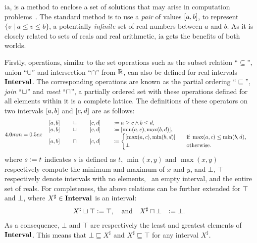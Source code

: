 \Gls{ia}, is a method to enclose a set of solutions that may arise in
computation problems~\cite{moore}.  The standard method is to use a \emph{pair}
of values $\left[{a}, {b}\right]$, to represent $\{ v \mid a \leq v \leq b \}$, a
potentially \emph{infinite} set of real numbers between $a$ and $b$.  As it
is closely related to sets of reals and real arithmetic, \gls{ia} gets the
benefits of both worlds.

Firstly, operations, similar to the set operations such as the subset relation
``$\subseteq$'', union ``$\cup$'' and intersection ``$\cap$'' from $\mathbb{R}$,
can also be defined for real intervals $\mathbf{Interval}$.  The corresponding
operations are known as the partial ordering ``$\sqsubseteq$'', \emph{join}
``$\sqcup$'' and \emph{meet} ``$\sqcap$'', a partially ordered set with these
operations defined for all elements within it is a complete lattice.  The
definitions of these operators on two intervals $\left[{a}, {b}\right]$ and
$\left[{c}, {d}\right]$ are as follows:
\begin{equation}
    \arraycolsep=0.5ex
    \begin{array}{lcll}
        \interval{a}{b} & \sqsubseteq & \interval{c}{d}
            &\defeq a \geq c \wedge b \leq d, \\
        \interval{a}{b} & \join & \interval{c}{d}
            &\defeq [\min(a, c), \max(b, d)], \\
        \interval{a}{b} & \meet & \interval{c}{d}
            &\defeq \left\{
                \begin{aligned}
                    & [\max(a, c), \min(b, d)] \quad &&
                        \text{if~} \max(a, c) \leq \min(b, d), \\
                    & \bot && \text{otherwise}.
                \end{aligned}
            \right.
    \end{array}\label{bg:eq:interval_relations}
\end{equation}
where $s \vcentcolon= t$ indicates $s$ is defined as $t$, $\min(x, y)$ and $\max(x,
y)$ respectively compute the minimum and maximum of $x$ and $y$, and $\bot$,
$\top$ respectively denote intervals with no elements, \ie~an empty interval,
and the entire set of reals.  For completeness, the above relations can be
further extended for $\top$ and $\bot$, where $X^\sharp \in \mathbf{Interval}$ is an
interval:
\begin{equation}
    \begin{aligned}
        X^\sharp \sqcup \top &\vcentcolon= \top, \quad \text{and} \quad
        X^\sharp \sqcap \bot &\vcentcolon= \bot.
    \end{aligned}
\end{equation}
As a consequence, $\bot$ and $\top$ are respectively the least and greatest
elements of $\mathbf{Interval}$.  This means that $\bot \sqsubseteq X^\sharp$ and
$X^\sharp \sqsubseteq \top$ for any interval $X^\sharp$.

